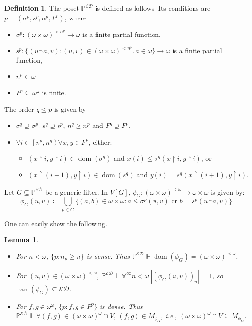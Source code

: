\documentclass[a4paper,12pt]{amsart}
\newtheorem{lem}[thm]{Lemma}
\theoremstyle{definition}
\newtheorem{dfn}[thm]{Definition}
\numberwithin{thm}{section}
\numberwithin{equation}{section}
\newcommand{\oo}{{\omega}^\omega}
\newcommand{\on}{\mathpunct{\upharpoonright}}
\DeclareMathOperator{\dom}{dom}
\DeclareMathOperator{\ran}{ran}
\newcommand{\ed}{\mathcal{ED}}
\renewcommand{\subset}{\subseteq}
\newcommand{\posetED}{\mathbb{P}^{\ed}}
\begin{document}
    \begin{dfn}\label{dfn_posetED}
        The poset $\posetED$ is defined as follows: Its conditions are $p=(\sigma^p,s^p,n^p,F^p)$, where
        \begin{itemize}
        	\item $\sigma^p\colon(\omega\times\omega)^{<n^p}\to\omega$ is a finite partial function, 
        	\item $s^p\colon\{(u^\frown a,v):(u,v)\in(\omega\times\omega)^{<n^p},a\in\omega\}\to\omega$ is a finite partial function, 
        	\item $n^p\in\omega$  
        	\item $F^p\subseteq\oo$ is finite.   
        \end{itemize}
        The order $q\leq p$ is given by
        \begin{itemize}
        	\item $\sigma^q\supseteq \sigma^p$, $s^q\supseteq s^p$, $n^q\geq n^p$ and $F^q\supseteq F^p$,  
        	\item $\forall i\in\left[n^p,n^q\right)\forall x,y\in F^p$, either:  
        	\begin{itemize}
        		\item $(x\on i, y\on i)\in\dom(\sigma^q)$ and $x(i)\leq\sigma^q(x\on i, y\on i)$, or  
        		\item $(x\on (i+1), y\on i)\in\dom(s^q)$ and $y(i)= s^q(x\on (i+1), y\on i)$.
        	\end{itemize}
        \end{itemize}
        Let $G\subset\posetED$ be a generic filter. In $V[G]$,  $\phi_G\colon(\omega\times\omega)^{<\omega}\to\omega\times\omega$ is given by: 
    	\[
        \phi_G(u,v)\coloneqq\bigcup_{p\in G}\{(a,b)\in\omega\times\omega:a\leq\sigma^p(u,v)\text{ or }b= s^p(u^\frown a,v)\}.
        \]
    \end{dfn}
    
    One can easily show the following.
    
    \begin{lem}
        \label{lem:posetED_basics}\leavevmode
    	\begin{itemize}
            \item For $n<\omega$, $\{p:n_p\geq n\}$ is dense. Thus $\posetED\Vdash\dom(\phi_G)=(\omega\times\omega)^{<\omega}$.
            \item For $(u,v)\in(\omega\times\omega)^{<\omega}$,  $\posetED\Vdash\forall^\infty n<\omega~|(\phi_G(u,v))_n|=1$, so $\ran(\phi_G)\subseteq\ed$.
            \item For $f,g\in \oo$, $\{p:f,g\in F^p\}$ is dense. 
    		Thus $\posetED\Vdash\forall(f,g)\in(\omega\times\omega)^\omega\cap V,~(f,g)\in M_{\phi_G}$, i.e., $(\omega\times\omega)^\omega\cap V\subseteq M_{\phi_G}$.
    	\end{itemize}
    \end{lem}
    
\end{document}
